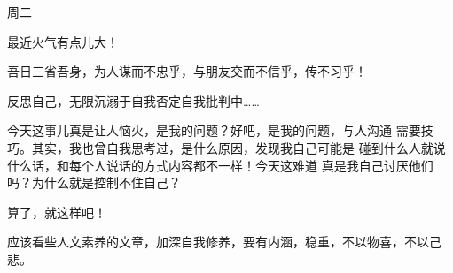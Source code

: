 

周二

最近火气有点儿大！

吾日三省吾身，为人谋而不忠乎，与朋友交而不信乎，传不习乎！

反思自己，无限沉溺于自我否定自我批判中……

今天这事儿真是让人恼火，是我的问题？好吧，是我的问题，与人沟通
需要技巧。其实，我也曾自我思考过，是什么原因，发现我自己可能是
碰到什么人就说什么话，和每个人说话的方式内容都不一样！今天这难道
真是我自己讨厌他们吗？为什么就是控制不住自己？

算了，就这样吧！

应该看些人文素养的文章，加深自我修养，要有内涵，稳重，不以物喜，不以己悲。


